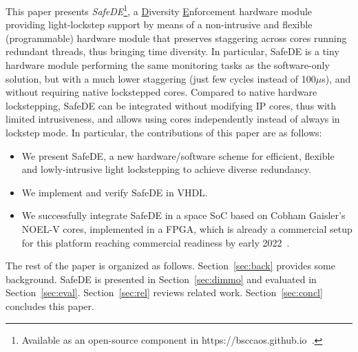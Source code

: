 This paper presents \emph{SafeDE}\footnote{Available as an open-source component in https://bsccaos.github.io~\cite{SafeTIWebsite}.}, a \underline{D}iversity \underline{E}nforcement hardware module providing light-lockstep support by means of a non-intrusive and flexible (programmable) hardware module that preserves staggering across cores running redundant threads, thus bringing time diversity. In particular, SafeDE is a tiny hardware module performing the same monitoring tasks as the software-only solution, but with a much lower staggering (just few cycles instead of 100$\mu$s), and without requiring native lockstepped cores. 
Compared to native hardware lockstepping, SafeDE can be integrated without modifying IP cores, thus with limited intrusiveness, and allows using cores independently instead of always in lockstep mode.
In particular, the contributions of this paper are as follows:
\begin{itemize}
\item We present SafeDE, a new hardware/software scheme for efficient, flexible and lowly-intrusive light lockstepping to achieve diverse redundancy.
\item We implement and verify SafeDE in VHDL.
\item We successfully integrate SafeDE in a space SoC based on Cobham Gaisler's NOEL-V cores, implemented in a FPGA, which is already a commercial setup for this platform reaching commercial readiness by early 2022~\cite{DeRISCjournal}.
\end{itemize}

The rest of the paper is organized as follows. Section~\ref{sec:back} provides some background. SafeDE is presented in Section~\ref{sec:dimmo} and evaluated in Section~\ref{sec:eval}. Section~\ref{sec:rel} reviews related work. Section~\ref{sec:concl} concludes this paper.

